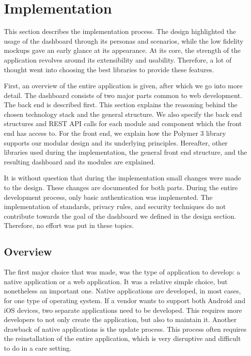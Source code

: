 \section{Implementation}\label{implementation}

This section describes the implementation process. The design highlighted the usage of the dashboard through its personas and scenarios, while the low fidelity mockups gave an early glance at its appearance. At its core, the strength of the application revolves around its extensibility and usability. Therefore, a lot of thought went into choosing the best libraries to provide these features.

First, an overview of the entire application is given, after which we go into more detail. The dashboard consists of two major parts common to web development. The back end is described first. This section explains the reasoning behind the chosen technology stack and the general structure. We also specify the back end structures and REST API calls for each module and component which the front end has access to. For the front end, we explain how the Polymer 3 library supports our modular design and its underlying principles. Hereafter, other libraries used during the implementation, the general front end structure, and the resulting dashboard and its modules are explained. 

It is without question that during the implementation small changes were made to the design. These changes are documented for both parts. During the entire development process, only basic authentication was implemented. The implementation of standards, privacy rules, and security techniques do not contribute towards the goal of the dashboard we defined in the design section. Therefore, no effort was put in these topics.

    \subsection{Overview}

    The first major choice that was made, was the type of application to develop: a native application or a web application. It was a relative simple choice, but nonetheless an important one. Native applications are developed, in most cases, for one type of operating system. If a vendor wants to support both Android and iOS devices, two separate applications need to be developed. This requires more developers to not only create the application, but also to maintain it. Another drawback of native applications is the update process. This process often requires the reinstallation of the entire application, which is very disruptive and difficult to do in a care setting.

